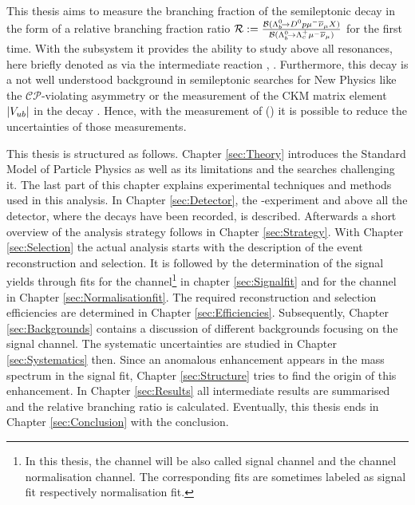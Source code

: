 This thesis aims to measure the branching fraction of the semileptonic decay \LbToDpmunuX in the form of a relative branching fraction ratio $\mathcal{R} := \frac{{\cal B}({{\Lambda}^0_{b}}\!\rightarrow {\ensuremath{{D}^0}}{\ensuremath{p}}{\ensuremath{\mu^-}}{\ensuremath{{\overline{\nu}}_\mu}} X)}{{\cal B}({{\Lambda}^0_{b}}\!\rightarrow {\ensuremath{{\Lambda}^+_{c}}}{\ensuremath{\mu^-}}{\ensuremath{{\overline{\nu}}_\mu}})}$ for the first time.
With the \Dz\proton subsystem it provides the ability to study above all \Lc resonances, here briefly denoted as \Lcstar via the intermediate reaction \decay{\Lb}{\Lcstar\mun\neumb}, \decay{\Lcstar}{\Dz\proton}.
Furthermore, this decay is a not well understood background in semileptonic searches for New Physics like the $\mathcal{CP}$-violating asymmetry \asld \cite{asld} or the measurement of the CKM matrix element $|{V_{{u}{b}}}|$ in the decay \decay{\Lb}{\proton\mun\neumb} \cite{SL_Vub}.
Hence, with the measurement of \BR(\LbToDpmunuX) it is possible to reduce the uncertainties of those measurements.

This thesis is structured as follows.
Chapter \ref{sec:Theory} introduces the Standard Model of Particle Physics as well as its limitations and the searches challenging it. The last part of this chapter explains experimental techniques and methods used in this analysis.
In Chapter \ref{sec:Detector}, the \lhcb-experiment and above all the detector, where the decays have been recorded, is described.
Afterwards a short overview of the analysis strategy follows in Chapter \ref{sec:Strategy}.
With Chapter \ref{sec:Selection} the actual analysis starts with the description of the event reconstruction and selection.
It is followed by the determination of the signal yields through fits for the \LbToDpmunuX channel\footnote{In this thesis, the channel \LbToDpmunuX will be also called signal channel and the \LbToLcmunu channel normalisation channel. The corresponding fits are sometimes labeled as signal fit respectively normalisation fit.}
in chapter \ref{sec:Signalfit} and for the \LbToLcmunu channel in Chapter \ref{sec:Normalisationfit}.
The required reconstruction and selection efficiencies are determined in Chapter \ref{sec:Efficiencies}.
Subsequently, Chapter \ref{sec:Backgrounds} contains a discussion of different backgrounds focusing on the \LbToDpmunuX signal channel.
The systematic uncertainties are studied in Chapter \ref{sec:Systematics} then.
Since an anomalous enhancement appears in the \Dz\proton mass spectrum in the signal fit, Chapter \ref{sec:Structure} tries to find the origin of this enhancement.
In Chapter \ref{sec:Results} all intermediate results are summarised and the relative branching ratio \R is calculated.
Eventually, this thesis ends in Chapter \ref{sec:Conclusion} with the conclusion.

